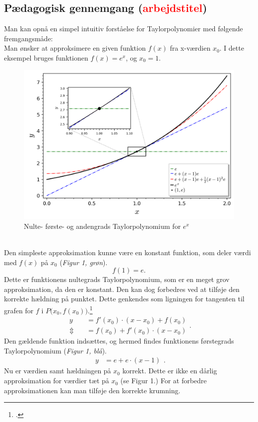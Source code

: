 \documentclass[12pt, a4paper]{article}
\begin{document}
\begin{refsection}
\subsection{Pædagogisk gennemgang (\textcolor{red}{arbejdstitel})}
Man kan opnå en simpel intuitiv forståelse for Taylorpolynomier med følgende fremgangsmåde:\\
Man ønsker at approksimere en given funktion $f(x)$ fra x-værdien $x_0$. I dette eksempel bruges funktionen $f(x)=e^x$, og $x_0=1$.\\
\begin{figure}[h!]
     \includegraphics[width=\textwidth]{figures/ex-eksempel.png}
     \caption{Nulte- første- og andengrads Taylorpolynomium for $e^x$}
     \label{fig:boat1}
\end{figure}\\
Den simpleste approksimation kunne være en konstant funktion, som deler værdi med $f(x)$ på $x_0$ (\textit{Figur 1, grøn}).
\[
f(1)=e
.\] 
Dette er funktionens nultegrads Taylorpolynomium, som er en meget grov approksimation, da den er konstant. Den kan dog forbedres ved at tilføje den korrekte hældning på punktet. Dette genkendes som ligningen for tangenten til grafen for $f$ i $P\big(x_0,f(x_0)\big)$.\footcite[s. 24, frml. 130]{formelsamling}
\[
\begin{aligned}
    y&=f'(x_0) \cdot (x-x_0)+f(x_0)\\
    \Updownarrow\quad &=f(x_0)+f'(x_0) \cdot (x-x_0)
\end{aligned}
.\] 
Den gældende funktion indsættes, og hermed findes funktionens førstegrads Taylorpolynomium  (\textit{Figur 1, blå}).\\
\[
\begin{aligned}
    y&=e+e\cdot (x-1)
\end{aligned}
.\] 
Nu er værdien samt hældningen på $x_0$ korrekt. Dette er ikke en dårlig approksimation for værdier tæt på $x_0$ (se Figur 1.) For at forbedre approksimationen kan man tilføje den korrekte krumning. 

\end{refsection}
\end{document}
